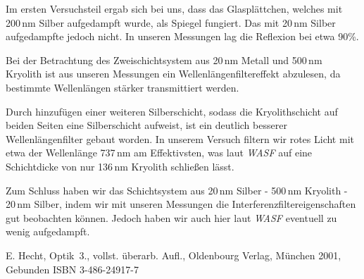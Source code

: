\documentclass[10pt,twoside]{article}
\renewcommand{\1}{^{-1}}
\renewcommand{\2}{^{-2}}
\newcommand{\3}{^{-3}}
\newcommand{\4}{^{-4}}
\newcommand{\5}{^{-5}}
\newcommand{\6}{^{-6}}
\newcommand{\7}{^{-7}}
\newcommand{\8}{^{-8}}
\newcommand{\9}{^{-9}}
\begin{document}
Im ersten Versuchsteil ergab sich bei uns, dass das Glasplättchen, welches mit 200\,nm Silber aufgedampft wurde, als Spiegel fungiert. Das mit 20\,nm Silber aufgedampfte jedoch nicht. In unseren Messungen lag die Reflexion bei etwa 90\%.

Bei der Betrachtung des Zweischichtsystem aus 20\,nm Metall und 500\,nm Kryolith ist aus unseren Messungen ein Wellenlängenfiltereffekt abzulesen, da bestimmte Wellenlängen stärker transmittiert werden.

Durch hinzufügen einer weiteren Silberschicht, sodass die Kryolithschicht auf beiden Seiten eine Silberschicht aufweist, ist ein deutlich besserer Wellenlängenfilter gebaut worden. In unserem Versuch filtern wir rotes Licht mit etwa der Wellenlänge 737\,nm am Effektivsten, was laut \textit{WASF} auf eine Schichtdicke von nur 136\,nm Kryolith schließen lässt. 

Zum Schluss haben wir das Schichtsystem aus 20\,nm Silber - 500\,nm Kryolith - 20\,nm Silber, indem wir mit unseren Messungen die Interferenzfiltereigenschaften gut beobachten können. Jedoch haben wir auch hier laut \textit{WASF} eventuell zu wenig aufgedampft. 

\renewcommand{\refname}{\textbf{Literaturverzeichnis}}
\begin{thebibliography}{xxxxxxxxxxxxxxx}

 		  		\glqq E. Hecht, Optik\grqq~3., vollst. überarb. Aufl., Oldenbourg Verlag, München 2001, Gebunden 
ISBN 3-486-24917-7
		 
\end{thebibliography}
\end{document}
